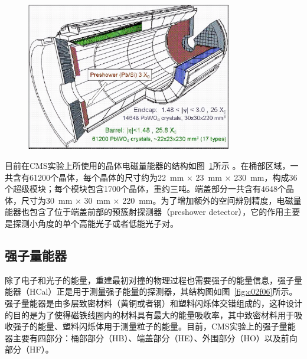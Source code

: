 \begin{figure}[!htbp]
    \centering
    \includegraphics[width=0.8\textwidth]{figures/chapter02/View-of-the-CMS-electromagnetic-calorimeter.png}
    \label{fig:c02f05}
\end{figure}

目前在CMS实验上所使用的晶体电磁量能器的结构如图~\ref{fig:c02f05}所示 。在桶部区域，一共含有61200个晶体，每个晶体的尺寸约为22~\si{mm} $\times$ 23~\si{mm} $\times$ 230~\si{mm}，构成36个超级模块；每个模块包含1700个晶体，重约三吨。端盖部分一共含有4648个晶体，尺寸为30~\si{mm} $\times$ 30~\si{mm} $\times$ 220~\si{mm}。为了增加额外的空间辨别精度，电磁量能器也包含了位于端盖前部的预簇射探测器（preshower detector），它的作用主要是探测小角度的单个高能光子或者低能光子对。

\subsection{强子量能器}

除了电子和光子的能量，重建最初对撞的物理过程也需要强子的能量信息，强子量能器（HCal）正是用于测量强子能量的探测器，其结构图如图~\ref{fig:c02f06}所示。强子量能器是由多层致密材料（黄铜或者钢）和塑料闪烁体交错组成的，这种设计的目的是为了使得磁铁线圈内的材料具有最大的能量吸收率，其中致密材料用于吸收强子的能量、塑料闪烁体用于测量粒子的能量。目前，CMS实验上的强子量能器主要有四部分：桶部部分（HB）、端盖部分（HE）、外围部分（HO）以及前向部分（HF）。


